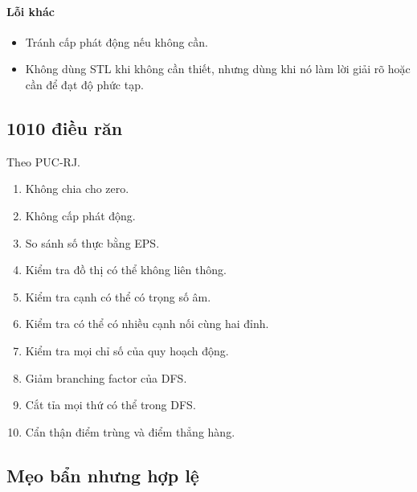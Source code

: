\documentclass[11pt]{article}
\begin{document}
\paragraph{Lỗi khác}\begin{itemize}

\item Tránh cấp phát động nếu không cần.

\item Không dùng STL khi không cần thiết, nhưng dùng khi nó làm lời giải rõ hoặc cần để đạt độ phức tạp.

\end{itemize}

\subsection{1010 điều răn}

Theo PUC-RJ.

\begin{enumerate}[start=0]

\item Không chia cho zero.

\item Không cấp phát động.

\item So sánh số thực bằng EPS.

\item Kiểm tra đồ thị có thể không liên thông.

\item Kiểm tra cạnh có thể có trọng số âm.

\item Kiểm tra có thể có nhiều cạnh nối cùng hai đỉnh.

\item Kiểm tra mọi chỉ số của quy hoạch động.

\item Giảm branching factor của DFS.

\item Cắt tỉa mọi thứ có thể trong DFS.

\item Cẩn thận điểm trùng và điểm thẳng hàng.

\end{enumerate}

\subsection{Mẹo bẩn nhưng hợp lệ}
\end{document}
